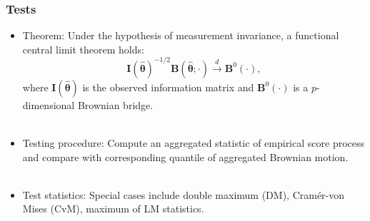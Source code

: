 \documentclass{beamer}
\begin{document}
\begin{frame}[fragile]
  \frametitle{Tests}
  \begin{itemize}
    \item Theorem: Under the hypothesis of
      measurement invariance, a functional central limit
      theorem holds:
  \begin{equation*}
  {\bm{I}}(\widehat{{\bm{\theta}}})^{-1/2}{\bm{B}}(\widehat{{\bm{\theta}}}; \cdot) 
\overset{d}{\rightarrow} {\bm B}^{0}(\cdot),
  \end{equation*}
 where ${\bm{I}}(\widehat{{\bm{\theta}}})$ is the observed
 information matrix and ${\bm B}^{0}(\cdot)$ is a
 $p$-dimensional Brownian bridge.\\ \ \\

   \item Testing procedure: Compute an aggregated statistic of empirical
     score process and compare with corresponding quantile of aggregated
     Brownian motion.\\ \ \\

    \item Test statistics: Special cases include double maximum (DM), Cram\'er-von Mises
      (CvM), maximum of LM statistics.
  \end{itemize}
\end{frame}

\end{document}
